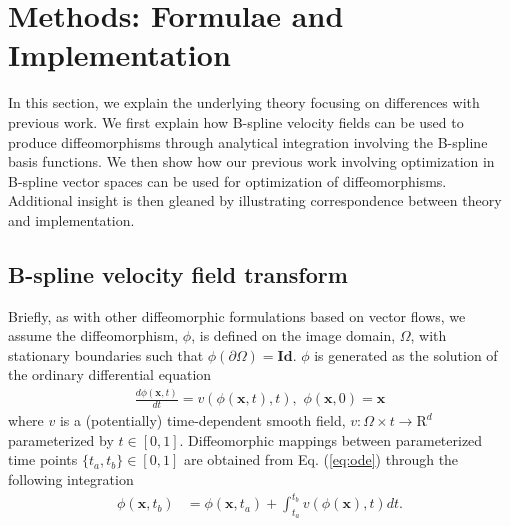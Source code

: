\documentclass{llncs}
\begin{document}
\section{Methods: Formulae  and Implementation}

In this section, we explain the underlying theory focusing on
differences with previous work.  We first explain how B-spline
velocity fields can be used to produce diffeomorphisms through
analytical integration involving the B-spline basis functions. 
We then show how our previous work involving optimization in 
B-spline vector spaces \cite{tustison2009} can be used for
optimization of diffeomorphisms.  Additional insight is then
gleaned by illustrating correspondence between theory and 
implementation.

\subsection{B-spline velocity field transform}

Briefly, as with other diffeomorphic formulations based on vector flows, we
assume the diffeomorphism, $\phi$, is defined on the image domain, $\Omega$, 
with stationary boundaries such that $\phi( \partial \Omega) = \mathbf{Id}$.
$\phi$ is generated as the solution of the ordinary differential
equation 
\begin{align}
  \label{eq:ode}
  \frac{d\phi(\mathbf{x}, t)}{dt} = v(\phi(\mathbf{x}, t), t),\,\,\phi( \mathbf{x}, 0 ) = \mathbf{x}
\end{align}
where $v$ is a (potentially) time-dependent smooth field, $v : \Omega \times t 
\rightarrow \mathrm{R}^d$ parameterized by $t \in [0,1]$.  Diffeomorphic mappings
between parameterized time points $\{t_a,t_b\} \in [0,1]$ 
are obtained from  Eq. (\ref{eq:ode}) through the following integration
\begin{align}
  \label{eq:integral}
\phi(\mathbf{x},t_b) &= \phi(\mathbf{x},t_a) + \int_{t_a}^{t_b} v(\phi(\mathbf{x}), t) dt.
\end{align}
\end{document}
